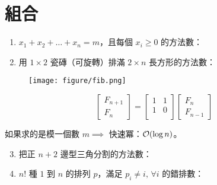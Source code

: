 \documentclass[standalone]{beamer}
\begin{document}
\section{組合}

\begin{frame}{}
  \begin{enumerate}[<+->]
    \item $x_1 + x_2 + \dots + x_n = m$，且每個 $x_i \geq 0$ 的方法數：
    \item 用 $1 \times 2$ 瓷磚（可旋轉）排滿 $2 \times n$ 長方形的方法數： \\
  \end{enumerate}
  \onslide<+->
  \begin{missue}
  \begin{figure}
    \texttt{[image: figure/fib.png]}
  \end{figure}
  \end{missue}
\end{frame}

\begin{frame}{}
  \[
  \begin{bmatrix}
    F_{n+1} \\
    F_{n}
  \end{bmatrix}
  =
  \begin{bmatrix}
    1 & 1 \\
    1 & 0 \\
  \end{bmatrix}
  \begin{bmatrix}
    F_{n} \\
    F_{n-1}
  \end{bmatrix}
\]
\pause

如果求的是模一個數 $m \implies$ 快速冪：$\mathcal{O}(\log n)$。
\end{frame}

\begin{frame}{}
  \begin{enumerate}[<+->]
    \setcounter{enumi}{2}
  \item 把正 $n+2$ 邊型三角分割的方法數：
  \item $n!$ 種 $1$ 到 $n$ 的排列 $p$，滿足 $p_i \neq i, \, \forall i$ 的錯排數：
    \onslide<+->{\[ \sum_{k = 0}^n (-1)^k {n \choose k} (n-k)! \]}
  \end{enumerate}
\end{frame}
\end{document}
